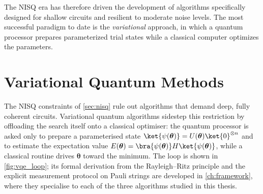 The NISQ era has therefore driven the development of algorithms specifically
designed for shallow circuits and resilient to moderate noise levels. The most
successful paradigm to date is the \emph{variational} approach, in which a
quantum processor prepares parameterized trial states while a classical computer
optimizes the parameters.


\section{Variational Quantum Methods}
\label{sec:variational}

The NISQ constraints of \cref{sec:nisq} rule out algorithms that demand
deep, fully coherent circuits. Variational quantum algorithms sidestep
this restriction by offloading the search itself onto a classical
optimiser: the quantum processor is asked only to prepare a parameterised
state $\ket{\psi(\bm{\theta})} = U(\bm{\theta})\ket{0}^{\otimes n}$ and to
estimate the expectation value
$E(\bm{\theta}) = \bra{\psi(\bm{\theta})}H\ket{\psi(\bm{\theta})}$, while
a classical routine drives $\bm{\theta}$ toward the minimum. The loop is
shown in \cref{fig:vqe_loop}; its formal derivation from the
Rayleigh--Ritz principle and the explicit measurement protocol on Pauli
strings are developed in \cref{ch:framework}, where they specialise to
each of the three algorithms studied in this thesis.

